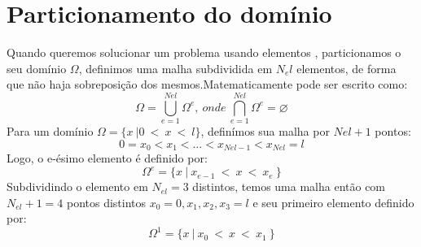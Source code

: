 \section{Particionamento do domínio}
 Quando queremos solucionar um problema usando elementos , particionamos o seu domínio $\Omega$, definimos uma malha subdividida em $N_el$ elementos, de forma que não haja sobreposição dos mesmos.Matematicamente pode ser escrito como:\
\begin{equation}
 \Omega  = \bigcup^{Nel}_{e= 1} \Omega^e,\ onde\ \bigcap^{Nel}_{e= 1} \Omega^e = \varnothing
\end{equation}
Para um domínio $ \Omega = \{x\ | 0 \ <\ x\ <\ l  \}$, definímos sua malha por $Nel + 1$ pontos:
\begin{equation}
 0  = x_0 < x_1 < \ldots < x_{Nel - 1} < x_{Nel} = l
\end{equation}
Logo, o e-ésimo elemento é definido por:
\begin{equation}
 \Omega^e = \{x\ |\ x_{e-1}\ <\ x\ <\ x_{e}\ \}
\end{equation}
 Subdividindo o elemento em $N_{el} = 3$ distintos, temos uma malha então com $N_{el} + 1 = 4$ pontos distintos $x_0 =0,x_1,x_2,x_3=l$ e seu primeiro elemento definido por:
\begin{equation}
 \Omega^1 = \{x\ |\ x_{0}\ <\ x\ <\ x_{1}\ \}
\end{equation}



